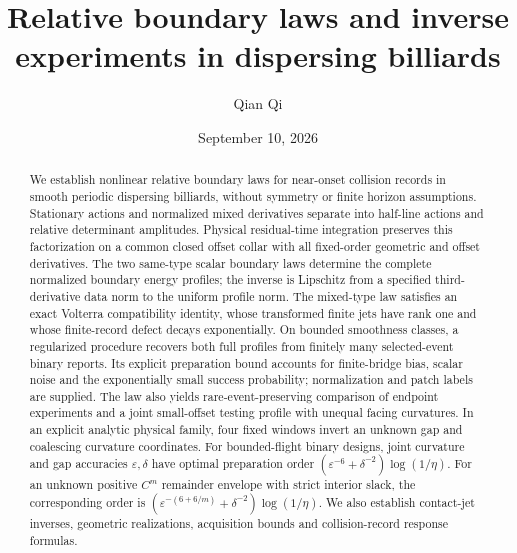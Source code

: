 
\title[Relative boundary laws and inverse experiments]{Relative boundary laws and inverse experiments
in dispersing billiards}
\author{Qian Qi}
\date{September 10, 2026}

\begin{abstract}
We establish nonlinear relative boundary laws for near-onset collision
records in smooth periodic dispersing billiards, without symmetry or
finite horizon assumptions. Stationary actions and normalized mixed
derivatives separate into half-line actions and relative determinant
amplitudes. Physical residual-time integration preserves this
factorization on a common closed offset collar with all fixed-order
geometric and offset derivatives. The two same-type scalar boundary
laws determine the complete normalized boundary energy profiles;
the inverse is Lipschitz from a specified third-derivative data norm
to the uniform profile norm. The mixed-type law satisfies an exact
Volterra compatibility identity, whose transformed finite jets have
rank one and whose finite-record defect decays exponentially.
On bounded smoothness classes, a regularized procedure recovers both
full profiles from finitely many selected-event binary reports. Its
explicit preparation bound accounts for finite-bridge bias, scalar
noise and the exponentially small success probability; normalization
and patch labels are supplied.
The law also yields rare-event-preserving comparison of endpoint
experiments and a joint small-offset testing profile with unequal
facing curvatures. In an explicit analytic physical family, four fixed
windows invert an unknown gap and coalescing curvature coordinates.
For bounded-flight binary designs, joint curvature and gap accuracies
$\varepsilon,\delta$ have optimal preparation order
$(\varepsilon^{-6}+\delta^{-2})\log(1/\eta)$.
For an unknown positive $C^m$ remainder envelope with strict interior
slack, the corresponding order is
$(\varepsilon^{-(6+6/m)}+\delta^{-2})\log(1/\eta)$.
We also establish contact-jet inverses, geometric realizations,
acquisition bounds and collision-record response formulas.
\end{abstract}
\maketitle


